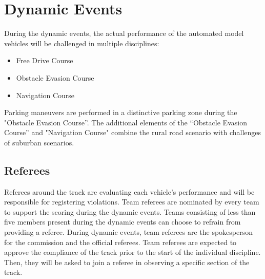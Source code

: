 \chapter{Dynamic Events}

\begin{highlight}
During the dynamic events, the actual performance of the automated model
vehicles will be challenged in multiple disciplines:
\begin{itemize}
    \item Free Drive Course
    \item Obstacle Evasion Course
    \item Navigation Course
\end{itemize}
Parking maneuvers are performed in a distinctive parking zone during the
"Obstacle Evasion Course”. The additional elements of
the “Obstacle Evasion Course” and "Navigation Course" combine the rural road scenario with challenges
of suburban scenarios.
\end{highlight}

\section{Referees}

Referees around the track are evaluating each vehicle’s performance and will be
responsible for registering violations. Team referees are nominated by every
team to support the scoring during the dynamic events. Teams consisting of less
than five members present during the dynamic events can choose to refrain from
providing a referee. During dynamic events, team referees are the spokesperson
for the commission and the official referees. Team referees are expected to
approve the compliance of the track prior to the start of the individual
discipline. Then, they will be asked to join a referee in observing a specific
section of the track.



